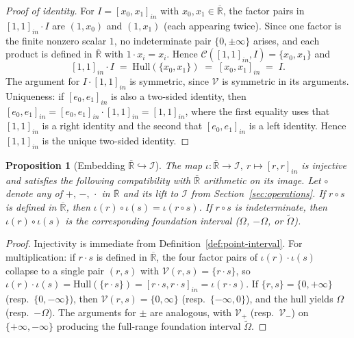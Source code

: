 \documentclass[11pt,a4paper]{article}
\theoremstyle{paperdef}
\newtheorem{proposition}[theorem]{Proposition}
\newcommand{\Rext}{\overline{\mathbb{R}}}
\newcommand{\Iset}{\mathcal{I}}
\newcommand{\inI}[1]{[#1]_{in}}
\newcommand{\V}{\mathcal{V}}
\newcommand{\Cand}{\mathcal{C}}
\begin{document}
\begin{proof}[Proof of identity]
For $I = \inI{x_0, x_1}$ with $x_0, x_1 \in \Rext$, the factor pairs
in $\inI{1, 1} \cdot I$ are $(1, x_0)$ and $(1, x_1)$ (each appearing
twice). Since one factor is the finite nonzero scalar $1$, no
indeterminate pair $\{0, \pm\infty\}$ arises, and each product is
defined in $\Rext$ with $1 \cdot x_i = x_i$. Hence
$\Cand(\inI{1,1}, I) = \{x_0, x_1\}$ and
\[
\inI{1, 1} \cdot I \;=\; \mathrm{Hull}(\{x_0, x_1\})
\;=\; \inI{x_0, x_1} \;=\; I.
\]
The argument for $I \cdot \inI{1, 1}$ is symmetric, since $\V$ is
symmetric in its arguments. Uniqueness: if $\inI{e_0, e_1}$ is also a
two-sided identity, then
$\inI{e_0, e_1} = \inI{e_0, e_1} \cdot \inI{1, 1} = \inI{1, 1}$, where
the first equality uses that $\inI{1, 1}$ is a right identity and the
second that $\inI{e_0, e_1}$ is a left identity. Hence $\inI{1, 1}$
is the unique two-sided identity.
\end{proof}

\begin{proposition}[Embedding $\Rext \hookrightarrow \Iset$]\label{prop:embedding}
The map $\iota : \Rext \to \Iset,\ r \mapsto \inI{r, r}$ is injective
and satisfies the following compatibility with $\Rext$ arithmetic on
its image. Let $\circ$ denote any of $+,\,-,\,\cdot$ in $\Rext$ and
its lift to $\Iset$ from Section~\ref{sec:operations}. If
$r \circ s$ is defined in $\Rext$, then
$\iota(r) \circ \iota(s) = \iota(r \circ s)$. If $r \circ s$ is
indeterminate, then $\iota(r) \circ \iota(s)$ is the corresponding
foundation interval ($\Omega$, $-\Omega$, or
$\widetilde{\Omega}$).
\end{proposition}

\begin{proof}
Injectivity is immediate from
Definition~\ref{def:point-interval}. For multiplication: if
$r \cdot s$ is defined in $\Rext$, the four factor pairs of
$\iota(r) \cdot \iota(s)$ collapse to a single pair $(r, s)$ with
$\V(r, s) = \{r \cdot s\}$, so $\iota(r) \cdot \iota(s) =
\mathrm{Hull}(\{r \cdot s\}) = \inI{r \cdot s, r \cdot s}
= \iota(r \cdot s)$. If $\{r, s\} = \{0, +\infty\}$ (resp.\
$\{0, -\infty\}$), then $\V(r, s) = \{0, \infty\}$ (resp.\
$\{-\infty, 0\}$), and the hull yields $\Omega$ (resp.\ $-\Omega$).
The arguments for $\pm$ are analogous, with $\V_{+}$ (resp.\
$\V_{-}$) on $\{+\infty, -\infty\}$ producing the full-range
foundation interval $\widetilde{\Omega}$.
\end{proof}
\end{document}

